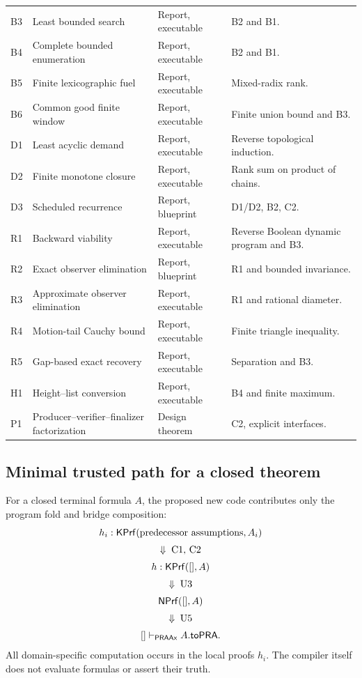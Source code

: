 \begin{longtable}{L{0.08\textwidth}L{0.30\textwidth}L{0.16\textwidth}L{0.35\textwidth}}
B3 & Least bounded search & Report, executable & B2 and B1.\\
B4 & Complete bounded enumeration & Report, executable & B2 and B1.\\
B5 & Finite lexicographic fuel & Report, executable & Mixed-radix rank.\\
B6 & Common good finite window & Report, executable & Finite union bound and B3.\\
D1 & Least acyclic demand & Report, executable & Reverse topological induction.\\
D2 & Finite monotone closure & Report, executable & Rank sum on product of chains.\\
D3 & Scheduled recurrence & Report, blueprint & D1/D2, B2, C2.\\
R1 & Backward viability & Report, executable & Reverse Boolean dynamic program and B3.\\
R2 & Exact observer elimination & Report, blueprint & R1 and bounded invariance.\\
R3 & Approximate observer elimination & Report, executable & R1 and rational diameter.\\
R4 & Motion-tail Cauchy bound & Report, executable & Finite triangle inequality.\\
R5 & Gap-based exact recovery & Report, executable & Separation and B3.\\
H1 & Height--list conversion & Report, executable & B4 and finite maximum.\\
P1 & Producer--verifier--finalizer factorization & Design theorem & C2, explicit interfaces.\\
\bottomrule
\end{longtable}

\subsection{Minimal trusted path for a closed theorem}

For a closed terminal formula \(A\), the proposed new code contributes only the
program fold and bridge composition:
\[
\begin{array}{c}
  h_i:\mathsf{KPrf}(\text{predecessor assumptions},A_i)\\[2mm]
  \Downarrow\;\text{C1, C2}\\[2mm]
  h:\mathsf{KPrf}([],A)\\[2mm]
  \Downarrow\;\text{U3}\\[2mm]
  \mathsf{NPrf}([],A)\\[2mm]
  \Downarrow\;\text{U5}\\[2mm]
  []\vdash_{\mathsf{PRAAx}}A.\mathsf{toPRA}.
\end{array}
\]
All domain-specific computation occurs in the local proofs \(h_i\).  The
compiler itself does not evaluate formulas or assert their truth.


